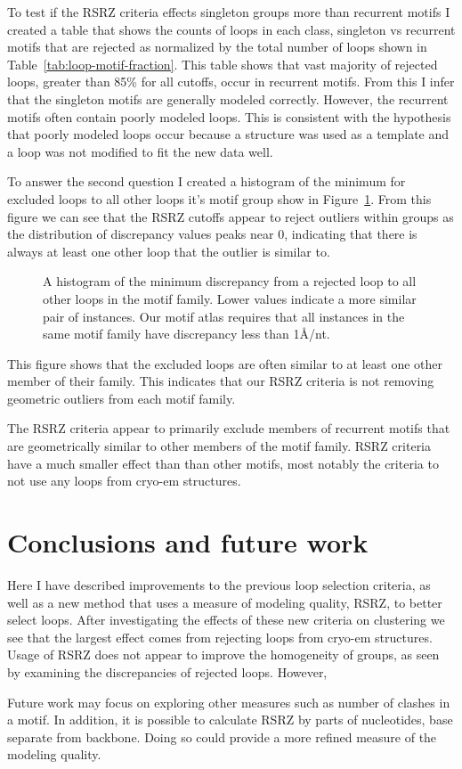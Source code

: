 To test if the RSRZ criteria effects singleton groups more than recurrent motifs
I created a table that shows the counts of loops in each class, singleton vs
recurrent motifs that are rejected as normalized by the total number of loops
shown in Table~\ref{tab:loop-motif-fraction}. This table shows that vast
majority of rejected loops, greater than 85\% for all cutoffs, occur in
recurrent motifs. From this I infer that the singleton motifs are generally
modeled correctly. However, the recurrent motifs  often contain poorly  modeled
loops. This is consistent with the hypothesis that poorly modeled loops occur
because a structure was used as a template and a loop was not modified to fit
the new data well.

To answer the second question I created a histogram of the minimum for excluded
loops to all other loops it's motif group show in
Figure~\ref{fig:exclude-min-disc}. From this figure we can see that the RSRZ
cutoffs appear to reject outliers within groups as the distribution of
discrepancy values peaks near 0, indicating that there is always at least one
other loop that the outlier is similar to.

\begin{figure}
  \caption{A histogram of the minimum discrepancy from a rejected loop to all
    other loops in the motif family. Lower values indicate a more similar pair
    of instances. Our motif atlas requires that all instances in the same motif
  family have discrepancy less than 1{\AA}/nt.}
  \label{fig:exclude-min-disc}
\end{figure}

This figure shows that the excluded loops are often similar to at least one
other member of their family. This indicates that our RSRZ criteria is not
removing geometric outliers from each motif family.

The RSRZ criteria appear to primarily exclude members of recurrent motifs that
are geometrically similar to other members of the motif family. RSRZ criteria
have a much smaller effect than than other motifs, most notably the criteria to
not use any loops from cryo-em structures.

\section{Conclusions and future work}

Here I have described improvements to the previous loop selection criteria, as
well as a new method that uses a measure of modeling quality, RSRZ, to better
select loops. After investigating the effects of these new criteria on
clustering we see that the largest effect comes from rejecting loops from
cryo-em structures. Usage of RSRZ does not appear to improve the homogeneity of
groups, as seen by examining the discrepancies of rejected loops. However,

Future work may focus on exploring other measures such as number of clashes in a
motif. In addition, it is possible to calculate RSRZ by parts of nucleotides,
base separate from backbone. Doing so could provide a more refined measure of
the modeling quality.
